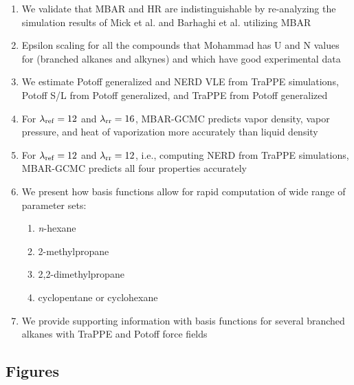 \documentclass[11pt,a4paper]{article}
\begin{document}
\begin{enumerate}
	\item We validate that MBAR and HR are indistinguishable by re-analyzing the simulation results of Mick et al. and Barhaghi et al. utilizing MBAR
    \item Epsilon scaling for all the compounds that Mohammad has U and N values for (branched alkanes and alkynes) and which have good experimental data
    \item We estimate Potoff generalized and NERD VLE from TraPPE simulations, Potoff S/L from Potoff generalized, and TraPPE from Potoff generalized
    \item For $\lambda_{\rm ref} = 12$ and $\lambda_{\rm rr} = 16$, MBAR-GCMC predicts vapor density, vapor pressure, and heat of vaporization more accurately than liquid density
    \item For $\lambda_{\rm ref} = 12$ and $\lambda_{\rm rr} = 12$, i.e., computing NERD from TraPPE simulations, MBAR-GCMC predicts all four properties accurately    
    \item We present how basis functions allow for rapid computation of wide range of parameter sets:
    \begin{enumerate}
    	\item \textit{n}-hexane
    	\item 2-methylpropane
    	\item 2,2-dimethylpropane
    	\item cyclopentane or cyclohexane
    \end{enumerate}
    \item We provide supporting information with basis functions for several branched alkanes with TraPPE and Potoff force fields
\end{enumerate}

\subsection{Figures}
\end{document}
